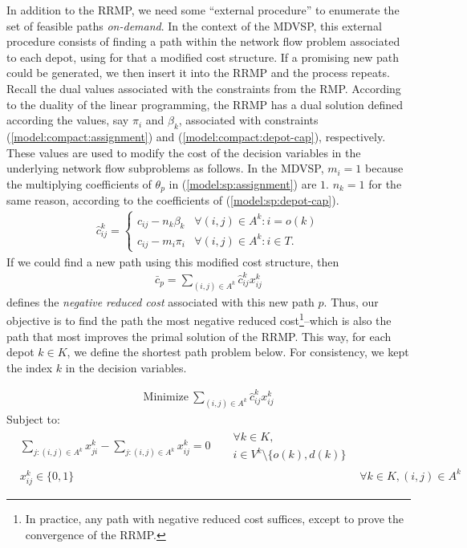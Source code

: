 \documentclass{article}
\begin{document}
In addition to the RRMP, we need some ``external procedure''
to enumerate the set of feasible paths \textit{on-demand}. In the context of the MDVSP, this external procedure consists of finding a path within the network flow problem associated to each depot, using for that a modified cost structure. If a promising new path could be generated, we then insert it into the RRMP and the process repeats. Recall the dual values associated with the constraints from the RMP. According to the duality of the linear programming, the RRMP has a dual solution defined according the values, say $\pi_i$ and $\beta_k$, associated with constraints (\ref{model:compact:assignment}) and (\ref{model:compact:depot-cap}), respectively. These values are used to modify the cost of the decision variables in the underlying network flow subproblems as follows. In the MDVSP, $m_i = 1$ because the multiplying coefficients of $\theta_p$ in (\ref{model:sp:assignment}) are $1$. $n_k = 1$ for the same reason, according to the coefficients of (\ref{model:sp:depot-cap}).
\begin{align}
   \hat{c}^k_{ij} =
   \begin{cases}
      c_{ij} - n_k\beta_k & \forall (i,j) \in A^k : i = o(k)\\
      c_{ij} - m_i\pi_i & \forall (i,j) \in A^k : i \in T.
   \end{cases}
\end{align}
If we could find a new path using this modified cost structure, then
\begin{align}
   \bar{c}_p = \sum_{(i,j) \in A^k} \hat{c}^k_{ij} x^k_{ij}
\end{align}
defines the \textit{negative reduced cost} associated with this new path $p$. Thus, our objective is to find the path the most negative reduced cost\footnote{In practice, any path with negative reduced cost suffices, except to prove the convergence of the RRMP.}--which is also the path that most improves the primal solution of the RRMP. This way, for each depot $k \in K$, we define the shortest path problem below. For consistency, we kept the index $k$ in the decision variables.

\noindent
\begin{minipage}{\linewidth}
   \begin{align}
      \mathrm{Minimize~}\sum_{(i,j) \in A^k} \hat{c}^k_{ij} x^k_{ij} \label{model:pricing:obj}
   \end{align}
   \qquad Subject to:
   \begin{align}
      & \sum_{j : (i,j) \in A^k} x^k_{ji} - \sum_{j : (i,j) \in A^k} x^k_{ij} = 0 &
      \begin{split}
         & \forall k \in K, \\
         & i \in V^k \setminus \{o(k), d(k)\}
      \end{split} \label{model:pricing:flow-conserv}\\[4pt]
      & x^k_{ij} \in \{0, 1\} & & \forall k \in K, (i,j) \in A^k \label{model:pricing:domain}
   \end{align}
\end{minipage}
\end{document}
